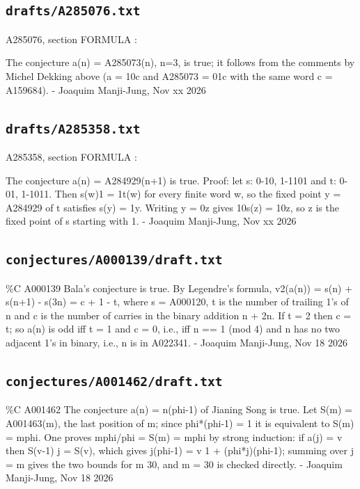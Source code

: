 \subsection*{\texttt{drafts/A285076.txt}}
{\small\raggedright\ttfamily
A285076, section FORMULA :\par
\par
The conjecture a(n) = A285073(n), n=3, is true; it follows from the comments by Michel Dekking above (a = 10c and A285073 = 01c with the same word c = A159684). - Joaquim Manji-Jung, Nov xx 2026\par
}
\subsection*{\texttt{drafts/A285358.txt}}
{\small\raggedright\ttfamily
A285358, section FORMULA :\par
\par
The conjecture a(n) = A284929(n+1) is true. Proof: let s: 0-10, 1-1101 and t: 0-01, 1-1011. Then s(w)1 = 1t(w) for every finite word w, so the fixed point y = A284929 of t satisfies s(y) = 1y. Writing y = 0z gives 10s(z) = 10z, so z is the fixed point of s starting with 1. - Joaquim Manji-Jung, Nov xx 2026\par
}
\subsection*{\texttt{conjectures/A000139/draft.txt}}
{\small\raggedright\ttfamily
\%C A000139 Bala's conjecture is true. By Legendre's formula, v2(a(n)) = s(n) + s(n+1) - s(3n) = c + 1 - t, where s = A000120, t is the number of trailing 1's of n and c is the number of carries in the binary addition n + 2n. If t = 2 then c = t; so a(n) is odd iff t = 1 and c = 0, i.e., iff n == 1 (mod 4) and n has no two adjacent 1's in binary, i.e., n is in A022341. - Joaquim Manji-Jung, Nov 18 2026\par
}
\subsection*{\texttt{conjectures/A001462/draft.txt}}
{\small\raggedright\ttfamily
\%C A001462 The conjecture a(n) = n(phi-1) of Jianing Song is true. Let S(m) = A001463(m), the last position of m; since phi*(phi-1) = 1 it is equivalent to S(m) = mphi. One proves mphi/phi = S(m) = mphi by strong induction: if a(j) = v then S(v-1)  j = S(v), which gives j(phi-1) = v  1 + (phi*j)(phi-1); summing over j = m gives the two bounds for m  30, and m = 30 is checked directly. - Joaquim Manji-Jung, Nov 18 2026\par
}
